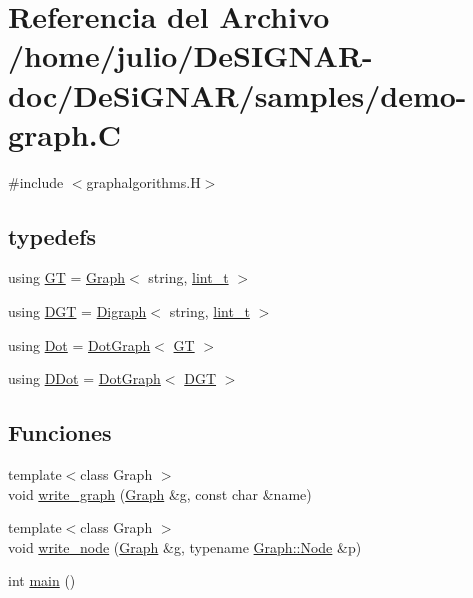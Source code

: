 \hypertarget{demo-graph_8_c}{}\section{Referencia del Archivo /home/julio/\+De\+S\+I\+G\+N\+A\+R-\/doc/\+De\+Si\+G\+N\+A\+R/samples/demo-\/graph.C}
\label{demo-graph_8_c}
{\ttfamily \#include $<$graphalgorithms.\+H$>$}\newline
\subsection*{typedefs}
\begin{DoxyCompactItemize}
\item 
using \hyperlink{demo-graph_8_c_aa29146ba261a2a26fce51cbd8557db3b}{GT} = \hyperlink{class_designar_1_1_graph}{Graph}$<$ string, \hyperlink{namespace_designar_a9d113d66a39e82b73727c72cd3a52f73}{lint\+\_\+t} $>$
\item 
using \hyperlink{demo-graph_8_c_a6b9eddfa4274f215240c1c90be9df2dc}{D\+GT} = \hyperlink{class_designar_1_1_digraph}{Digraph}$<$ string, \hyperlink{namespace_designar_a9d113d66a39e82b73727c72cd3a52f73}{lint\+\_\+t} $>$
\item 
using \hyperlink{demo-graph_8_c_a70657b0b48a4d69ef850be3c5517ecc2}{Dot} = \hyperlink{class_designar_1_1_dot_graph}{Dot\+Graph}$<$ \hyperlink{demo-buildgraph_8_c_a3001c40d2c31ca87ed96cd7d1334a55e}{GT} $>$
\item 
using \hyperlink{demo-graph_8_c_a0ffdd103a7285712ccbd9548ff5544e7}{D\+Dot} = \hyperlink{class_designar_1_1_dot_graph}{Dot\+Graph}$<$ \hyperlink{demo-buildgraph_8_c_ae73e956c2a8cf0a58255aa6b659985e0}{D\+GT} $>$
\end{DoxyCompactItemize}
\subsection*{Funciones}
\begin{DoxyCompactItemize}
\item 
{\footnotesize template$<$class Graph $>$ }\\void \hyperlink{demo-graph_8_c_a75dee8f1e6289c0fbd2060e643605bfe}{write\+\_\+graph} (\hyperlink{class_designar_1_1_graph}{Graph} \&g, const char \&name)
\item 
{\footnotesize template$<$class Graph $>$ }\\void \hyperlink{demo-graph_8_c_abe260b66e94b606f11fd75beedd0f6dc}{write\+\_\+node} (\hyperlink{class_designar_1_1_graph}{Graph} \&g, typename \hyperlink{class_designar_1_1_graph_a5dfc7dba9d092ac489c72e40390c37d0}{Graph\+::\+Node} \&p)
\item 
int \hyperlink{demo-graph_8_c_ae66f6b31b5ad750f1fe042a706a4e3d4}{main} ()
\end{DoxyCompactItemize}


